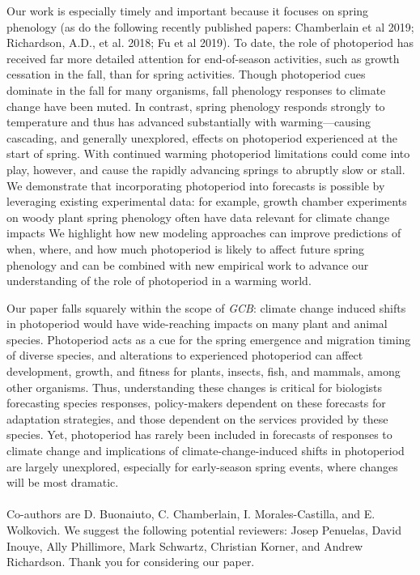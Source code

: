 \documentclass[10.7pt,a4paper]{letter}
\begin{document}
\begin{letter}{}
Our work is especially timely and important because it focuses on spring phenology (as do the following recently published papers: Chamberlain et al 2019; Richardson, A.D., et al. 2018; Fu et al 2019). To date, the role of photoperiod has received far more detailed attention for end-of-season activities, such as growth cessation in the fall, than for spring activities. Though photoperiod cues dominate in the fall for many organisms, fall phenology responses to climate change have been muted. In contrast, spring phenology responds strongly to temperature and thus has advanced substantially with warming---causing cascading, and generally unexplored, effects on photoperiod experienced at the start of spring. With continued warming photoperiod limitations could come into play, however, and cause the rapidly advancing springs to abruptly slow or stall. We demonstrate that incorporating photoperiod into forecasts is possible by leveraging existing experimental data: for example, growth chamber experiments on woody plant spring phenology often have data relevant for climate change impacts %
We highlight how new modeling approaches can improve predictions of when, where, and how much photoperiod is likely to affect future spring phenology and can be combined with new empirical work to advance our understanding of the role of photoperiod in a warming world. 

Our paper falls squarely within the scope of \emph{GCB}: climate change induced shifts in photoperiod would have wide-reaching impacts on many plant and animal species. Photoperiod acts as a cue for the spring emergence and migration timing of diverse species, and alterations to experienced photoperiod can affect development, growth, and fitness for plants, insects, fish, and mammals, among other organisms. Thus, understanding these changes is critical for biologists forecasting species responses, policy-makers dependent on these forecasts for adaptation strategies, and those dependent on the services provided by these species. Yet, photoperiod has rarely been included in forecasts of responses to climate change and implications of climate-change-induced shifts in photoperiod are largely unexplored, especially for early-season spring events, where changes will be most dramatic. 
\\
\\
Co-authors are D. Buonaiuto, C. Chamberlain, I. Morales-Castilla, and E. Wolkovich. We suggest the following potential reviewers: Josep Penuelas, David Inouye, Ally Phillimore, Mark Schwartz, Christian Korner, and Andrew Richardson.
Thank you for considering our paper.


\end{letter}
\end{document}
